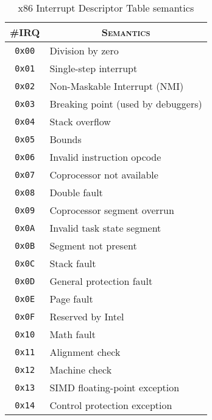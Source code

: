 \begin{table}
  \centering
  \begin{tabular}{cl}
    {\scshape \#IRQ}
    & \multicolumn{1}{c}{\scshape Semantics} \\
    \hline
    \texttt{0x00}
    & Division by zero \\
    \texttt{0x01}
    & Single-step interrupt \\
    \texttt{0x02}
    & Non-Maskable Interrupt (NMI) \\
    \texttt{0x03}
    & Breaking point (used by debuggers) \\
    \texttt{0x04}
    & Stack overflow \\
    \texttt{0x05}
    & Bounds \\
    \texttt{0x06}
    & Invalid instruction opcode \\
    \texttt{0x07}
    & Coprocessor not available \\
    \texttt{0x08}
    & Double fault \\
    \texttt{0x09}
    & Coprocessor segment overrun \\
    \texttt{0x0A}
    & Invalid task state segment \\
    \texttt{0x0B}
    & Segment not present \\
    \texttt{0x0C}
    & Stack fault \\
    \texttt{0x0D}
    & General protection fault \\
    \texttt{0x0E}
    & Page fault \\
    \texttt{0x0F}
    & Reserved by Intel \\
    \texttt{0x10}
    & Math fault \\
    \texttt{0x11}
    & Alignment check \\
    \texttt{0x12}
    & Machine check \\
    \texttt{0x13}
    & SIMD floating-point exception \\
    \texttt{0x14}
    & Control protection exception \\
  \end{tabular}
  \caption{x86 Interrupt Descriptor Table semantics}
  \label{tab:usecase:idt}
\end{table}

